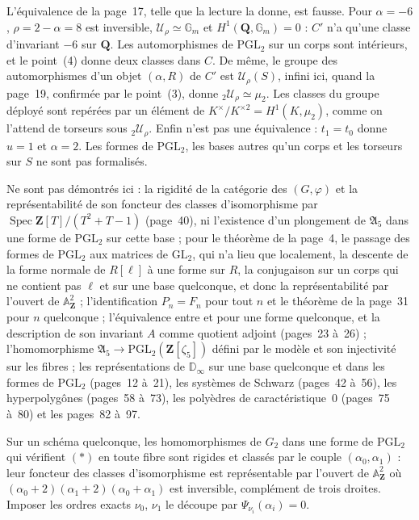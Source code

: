 \begin{remarque}
L'équivalence de la page~17, telle que la lecture la donne, est fausse. Pour $\alpha = -6$, $\rho = 2 - \alpha = 8$ est inversible, $\mathcal U_\rho \simeq \mathbb G_m$ et $H^1(\mathbf Q, \mathbb G_m) = 0$ : $C'$ n'a qu'une classe d'invariant $-6$ sur $\mathbf Q$. Les automorphismes de $\mathrm{PGL}_2$ sur un corps sont intérieurs, et le point~(4) donne deux classes dans $C$. De même, le groupe des automorphismes d'un objet $(\alpha, R)$ de $C'$ est $\mathcal U_\rho(S)$, infini ici, quand la page~19, confirmée par le point~(3), donne ${}_2\mathcal U_\rho \simeq \mu_2$. Les classes du groupe déployé sont repérées par un élément de $K^\times/K^{\times 2} = H^1(K, \mu_2)$, comme on l'attend de torseurs sous ${}_2\mathcal U_\rho$. Enfin  n'est pas une équivalence : $t_1 = t_0$ donne $u = 1$ et $\alpha = 2$. Les formes de $\mathrm{PGL}_2$, les bases autres qu'un corps et les torseurs sur $S$ ne sont pas formalisés.
\end{remarque}

Ne sont pas démontrés ici : la rigidité de la catégorie des $(G, \varphi)$ et la représentabilité de son foncteur des classes d'isomorphisme par $\operatorname{Spec} \mathbf Z[T]/(T^2 + T - 1)$ (page~40), ni l'existence d'un plongement de $\mathfrak A_5$ dans une forme de $\mathrm{PGL}_2$ sur cette base ; pour le théorème de la page~4, le passage des formes de $\mathrm{PGL}_2$ aux matrices de $\mathrm{GL}_2$, qui n'a lieu que localement, la descente de la forme normale de $R[\ell]$ à une forme sur $R$, la conjugaison sur un corps qui ne contient pas $\ell$ et sur une base quelconque, et donc la représentabilité par l'ouvert de $\mathbb A^2_{\mathbf Z}$ ; l'identification $P_n = F_n$ pour tout $n$ et le théorème de la page~31 pour $n$ quelconque ; l'équivalence entre  et  pour une forme quelconque, et la description de son invariant $A$ comme quotient adjoint (pages~23 à~26) ; l'homomorphisme $\mathfrak A_5 \to \mathrm{PGL}_2(\mathbf Z[\zeta_5])$ défini par le modèle et son injectivité sur les fibres ; les représentations de $\mathbb D_\infty$ sur une base quelconque et dans les formes de $\mathrm{PGL}_2$ (pages~12 à~21), les systèmes de Schwarz (pages~42 à~56), les hyperpolygônes (pages~58 à~73), les polyèdres de caractéristique~$0$ (pages~75 à~80) et les pages~82 à~97.

\begin{encadre}
\begin{theoreme}\nonverifie
Sur un schéma quelconque, les homomorphismes de $G_2$ dans une forme de $\mathrm{PGL}_2$ qui vérifient $(*)$ en toute fibre sont rigides et classés par le couple $(\alpha_0, \alpha_1)$ : leur foncteur des classes d'isomorphisme est représentable par l'ouvert de $\mathbb A^2_{\mathbf Z}$ où $(\alpha_0 + 2)(\alpha_1 + 2)(\alpha_0 + \alpha_1)$ est inversible, complément de trois droites. Imposer les ordres exacts $\nu_0$, $\nu_1$ le découpe par $\Psi_{\nu_i}(\alpha_i) = 0$.
\end{theoreme}
\end{encadre}

